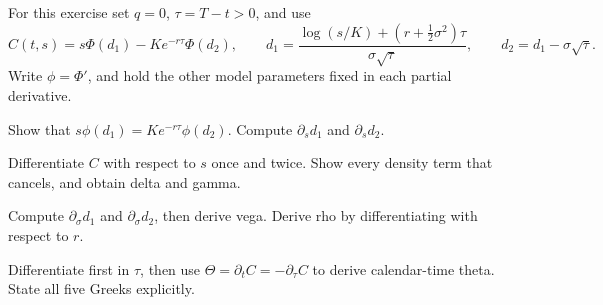 \begin{exercise}
For this exercise set \(q=0\), \(\tau=T-t>0\), and use
\[
C(t,s)=s\Phi(d_1)-Ke^{-r\tau}\Phi(d_2),\qquad
d_1=\frac{\log(s/K)+(r+\tfrac12\sigma^2)\tau}{\sigma\sqrt\tau},
\qquad d_2=d_1-\sigma\sqrt\tau.
\]
Write \(\phi=\Phi'\), and hold the other model parameters fixed in each
partial derivative.
\begin{exparts}
  \item Show that \(s\phi(d_1)=Ke^{-r\tau}\phi(d_2)\). Compute
  \(\partial_s d_1\) and \(\partial_s d_2\).
  \item Differentiate \(C\) with respect to \(s\) once and twice. Show
  every density term that cancels, and obtain delta and gamma.
  \item Compute \(\partial_\sigma d_1\) and \(\partial_\sigma d_2\),
  then derive vega. Derive rho by differentiating with respect to \(r\).
  \item Differentiate first in \(\tau\), then use
  \(\Theta=\partial_tC=-\partial_\tau C\) to derive calendar-time theta.
  State all five Greeks explicitly.
\end{exparts}
\end{exercise}
